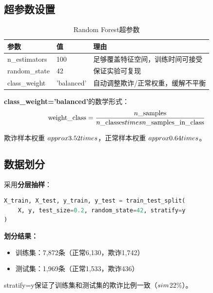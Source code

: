\documentclass[12pt,a4paper]{article}
\begin{document}
\subsection{超参数设置}

\begin{table}[H]
\centering
\caption{Random Forest超参数}
\begin{tabular}{@{}lll@{}}
\toprule
\textbf{参数} & \textbf{值} & \textbf{理由} \\
\midrule
n\_estimators & 100 & 足够覆盖特征空间，训练时间可接受 \\
random\_state & 42 & 保证实验可复现 \\
class\_weight & 'balanced' & 自动调整欺诈/正常权重，缓解不平衡 \\
\bottomrule
\end{tabular}
\end{table}

\textbf{class\_weight='balanced'}的数学形式：
\begin{equation}
\text{weight\_class} = \frac{n\_\text{samples}}{n\_\text{classes} \\times n\_\text{samples\_in\_class}}
\end{equation}

欺诈样本权重 $\\approx 3.52\\times$，正常样本权重 $\\approx 0.64\\times$。

\subsection{数据划分}

采用\textbf{分层抽样}：
\begin{lstlisting}[language=Python]
X_train, X_test, y_train, y_test = train_test_split(
    X, y, test_size=0.2, random_state=42, stratify=y
)
\end{lstlisting}

\textbf{划分结果：}
\begin{itemize}
    \item 训练集：7{,}872条（正常6{,}130，欺诈1{,}742）
    \item 测试集：1{,}969条（正常1{,}533，欺诈436）
\end{itemize}

stratify=y保证了训练集和测试集的欺诈比例一致（$\\sim$22\%）。

\end{document}
